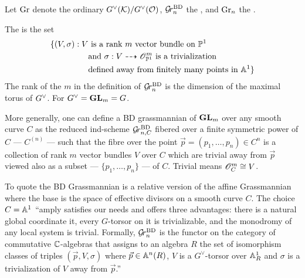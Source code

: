 \documentclass{article}
\newcommand{\anne}[2]{\colorbox{pink!75!blue}{#1}\marginpar[]{\tiny\textbf{\color{pink!50!blue}#2}}}
\begin{document}
Let $\Gr$ denote the ordinary  $\Gch(\cK)/\Gch(\cO)$, $\Grbd$ the , and $\Grc$ the . 

\begin{definition}
    The  is the set 
    \begin{equation}
        \label{eq:grbd}
    \begin{aligned}
        \{(V,\sigma) : V &\text{ is a rank } m \text{ vector bundle on }\PP^1 \\ &\text{and } \sigma: V \dashrightarrow \scO_{\PP^1}^m \text{ is a trivialization} \\
        &\text{defined away from finitely many points in }\AA^1\}
    \end{aligned}
    \end{equation}
    The rank of the $m$ in the definition of $\Grbd$ is the dimension of the maximal torus of $\Gch$. For $\Gch =\GL_m = G$. 

    More generally, one can define a BD grassmannian of $\GL_m$ over any smooth curve $C$ as the reduced ind-scheme $\Grbd[n,C]$ fibered over a finite symmetric power of $C$ --- $C^{(n)}$ --- such that the fibre over the point $\vec p = (p_1,\dots,p_n)\in C^n$ is a collection of rank $m$ vector bundles $V$ over $C$ which are trivial away from $\vec p$ viewed also as a subset --- $\{p_1,\dots,p_n\}$ --- of $C$. Trivial means $\scO_C^m\cong V$. 
\end{definition}

To quote \cite{baumann2020bases} the BD Grassmannian is a relative version of the affine Grassmannian where the base is the space of effective divisors on a smooth curve $C$. The choice $C = \AA^1$ ``amply satisfies our needs and offers three advantages: there is a natural global coordinate it, every \anne{$G$-torsor}{i.e. principal $G$ bundle?} on it is trivializable, and the monodromy of any local system is trivial. Formally, $\Grbd$ is the functor on the category of commutative $\CC$-algebras that assigns to an algebra $R$ the set of isomorphism classes of triples $(\vec p,V,\sigma)$ where $\vec p\in \AA^n(R)$, $V$ is a $G^\vee$-torsor over $\AA^1_R$ and $\sigma$ is a trivialization of $V$ away from $\vec p$.''  
\end{document}
